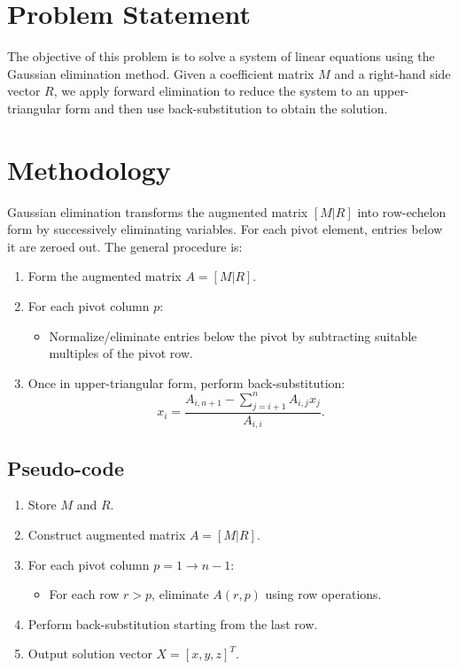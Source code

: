 \section*{Problem Statement} 
The objective of this problem is to solve a system of linear equations using the Gaussian elimination method. Given a coefficient matrix $M$ and a right-hand side vector $R$, we apply forward elimination to reduce the system to an upper-triangular form and then use back-substitution to obtain the solution.

\section*{Methodology} 
Gaussian elimination transforms the augmented matrix $[M|R]$ into row-echelon form by successively eliminating variables. For each pivot element, entries below it are zeroed out. The general procedure is:
\begin{enumerate}
  \item Form the augmented matrix $A = [M|R]$.
  \item For each pivot column $p$:
    \begin{itemize}
      \item Normalize/eliminate entries below the pivot by subtracting suitable multiples of the pivot row.
    \end{itemize}
  \item Once in upper-triangular form, perform back-substitution:
  \[
  x_i = \frac{A_{i,n+1} - \sum_{j=i+1}^{n} A_{i,j}x_j}{A_{i,i}}.
  \]
\end{enumerate}

\subsection*{Pseudo-code}
\begin{enumerate}
  \item Store $M$ and $R$.
  \item Construct augmented matrix $A = [M|R]$.
  \item For each pivot column $p = 1 \to n-1$:
  \begin{itemize}
    \item For each row $r > p$, eliminate $A(r,p)$ using row operations.
  \end{itemize}
  \item Perform back-substitution starting from the last row.
  \item Output solution vector $X = [x,y,z]^T$.
\end{enumerate}


